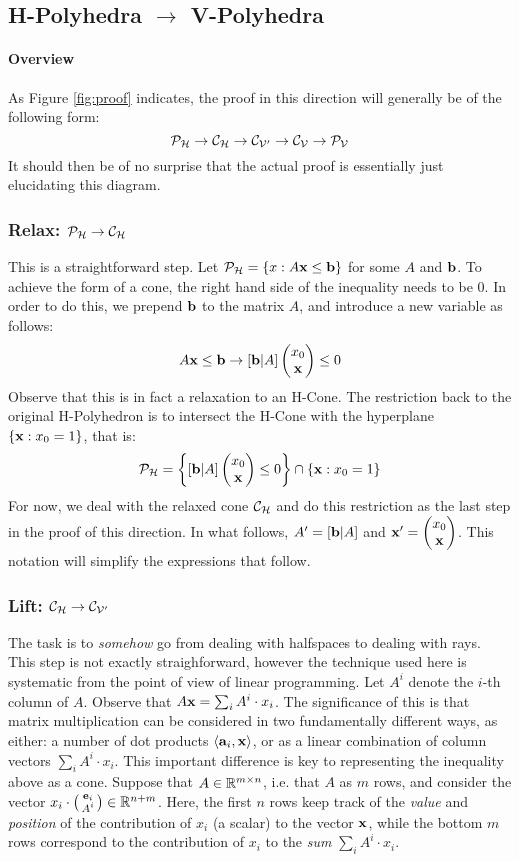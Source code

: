
\subsection{H-Polyhedra $\to$ V-Polyhedra}
\paragraph{Overview}
As Figure \ref{fig:proof} indicates, the proof in this direction will generally be of the following form:
  \[ \mathcal{P}_{\mathcal{H}} \to \mathcal{C}_{\mathcal{H}} \to \mathcal{C}_{\mathcal{V'}} \to \mathcal{C}_{\mathcal{V}} \to \mathcal{P}_{\mathcal{V}} \]
It should then be of no surprise that the actual proof is essentially just elucidating this diagram.

\subsubsection{Relax: $\mathcal{P}_{\mathcal{H}} \to \mathcal{C}_{\mathcal{H}}$} 
This is a straightforward step.  Let $\mathcal{P}_{\mathcal{H}} = \{x : A\mathbf{x} \leq \mathbf{b}\}$ for some $A$ and $\mathbf{b}$.  To achieve the form of a cone, the right hand side of the inequality needs to be $0$.  In order to do this, we prepend $\mathbf{b}$ to the matrix $A$, and introduce a new variable as follows:
  \[ A\mathbf{x} \leq \mathbf{b} \to [\mathbf{b}|A] \begin{pmatrix}x_0 \\ \mathbf{x}\end{pmatrix} \leq 0 \]
Observe that this is in fact a relaxation to an H-Cone.  The restriction back to the original H-Polyhedron is to intersect the H-Cone with the hyperplane $\{\mathbf{x} : x_0 = 1\}$, that is:
  \[ \mathcal{P}_{\mathcal{H}} = \left\{ [\mathbf{b}|A] \begin{pmatrix}x_0 \\ \mathbf{x}\end{pmatrix} \leq 0 \right\} \cap \{ \mathbf{x} : x_0 = 1 \} \]
For now, we deal with the relaxed cone $\mathcal{C}_{\mathcal{H}}$ and do this restriction as the last step in the proof of this direction.  In what follows, $A' = [\mathbf{b}|A]$ and $\mathbf{x}' = \begin{pmatrix}x_0 \\ \mathbf{x}\end{pmatrix}$.  This notation will simplify the expressions that follow.

\subsubsection{Lift: $\mathcal{C}_{\mathcal{H}} \to \mathcal{C}_{\mathcal{V'}}$}
The task is to \textit{somehow} go from dealing with halfspaces to dealing with rays.  This step is not exactly straighforward, however the technique used here is systematic from the point of view of linear programming.  Let $A^i$ denote the $i$-th column of $A$.  Observe that $A\mathbf{x} = \sum_i A^i\cdot x_i$.  The significance of this is that matrix multiplication can be considered in two fundamentally different ways, as either: a number of dot products $\langle \mathbf{a}_i, \mathbf{x} \rangle$, or as a linear combination of column vectors $\sum_i A^i\cdot x_i$.  This important difference is key to representing the inequality above as a cone.  Suppose that $A \in \mathbb{R}^{m\times n}$, i.e. that $A$ as $m$ rows, and consider the vector $x_i\cdot\left(\begin{smallmatrix}\mathbf{e}_i \\ A^i\end{smallmatrix}\right) \in \mathbb{R}^{n + m}$.  Here, the first $n$ rows keep track of the \textit{value} and \textit{position} of the contribution of $x_i$ (a scalar) to the vector $\mathbf{x}$, while the bottom $m$ rows correspond to the contribution of $x_i$ to the \textit{sum} $\sum_i A^i\cdot x_i$.

